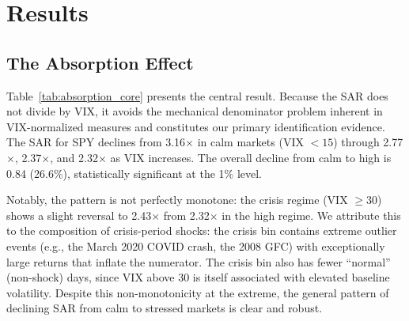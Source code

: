 \documentclass[12pt,a4paper]{article}
\begin{document}
\section{Results}
\label{sec:results}

\subsection{The Absorption Effect}
\label{sec:core}

Table~\ref{tab:absorption_core} presents the central result. Because the SAR does not divide by VIX, it avoids the mechanical denominator problem inherent in VIX-normalized measures and constitutes our primary identification evidence. The SAR for SPY declines from 3.16$\times$ in calm markets (VIX $< 15$) through 2.77$\times$, 2.37$\times$, and 2.32$\times$ as VIX increases. The overall decline from calm to high is 0.84 (26.6\%), statistically significant at the 1\% level.

Notably, the pattern is not perfectly monotone: the crisis regime (VIX $\geq 30$) shows a slight reversal to 2.43$\times$ from 2.32$\times$ in the high regime. We attribute this to the composition of crisis-period shocks: the crisis bin contains extreme outlier events (e.g., the March 2020 COVID crash, the 2008 GFC) with exceptionally large returns that inflate the numerator. The crisis bin also has fewer ``normal'' (non-shock) days, since VIX above 30 is itself associated with elevated baseline volatility. Despite this non-monotonicity at the extreme, the general pattern of declining SAR from calm to stressed markets is clear and robust.
\end{document}
